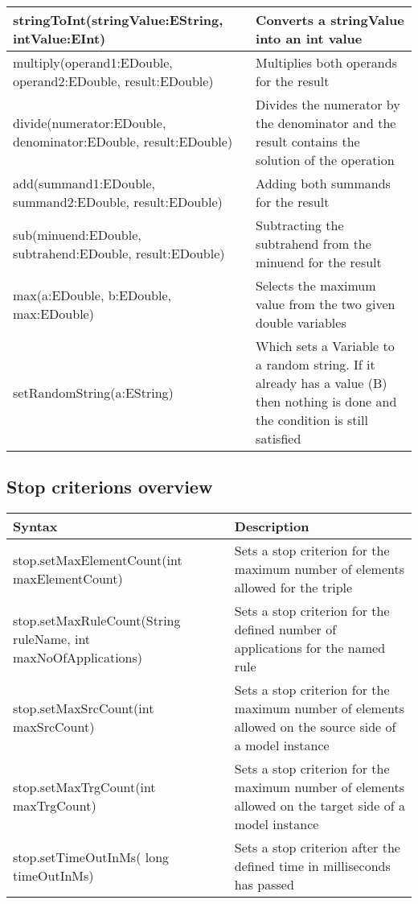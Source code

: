 {\begin{center}
\begin{tabular}{ | m{6cm} | m{7cm} |  }
\hline
stringToInt(stringValue:EString, intValue:EInt) & Converts a stringValue into an int value \\
\hline
multiply(operand1:EDouble, operand2:EDouble, result:EDouble) & Multiplies both operands for the result \\
\hline
divide(numerator:EDouble, denominator:EDouble, result:EDouble)  & Divides the numerator by the denominator  and the result contains the solution of the operation \\
\hline
add(summand1:EDouble, summand2:EDouble, result:EDouble) & Adding both summands for the result \\
\hline
sub(minuend:EDouble, subtrahend:EDouble, result:EDouble)  & Subtracting the subtrahend from the minuend for the result \\
\hline
max(a:EDouble, b:EDouble, max:EDouble) & Selects the maximum value from the two given double variables \\
\hline
setRandomString(a:EString)  & Which sets a Variable to a random string. If it already has a value (B) then nothing is done and the condition is still satisfied \\
\hline

\end{tabular}
\end{center}
}

\clearpage

\subsection{Stop criterions overview}

{
\begin{center}
\begin{tabular}{ | m{6cm} | m{7cm} |  }
\hline
\textbf{Syntax} & \textbf{Description} \\
\hline
stop.setMaxElementCount(int maxElementCount) & Sets a stop criterion for the maximum number of elements allowed for the triple  \\
\hline
 stop.setMaxRuleCount(String ruleName, int maxNoOfApplications) & Sets a stop criterion for the defined number of applications for the named rule  \\
\hline
stop.setMaxSrcCount(int maxSrcCount) & Sets a stop criterion for the maximum number of elements allowed on the source side of a model instance \\
\hline
stop.setMaxTrgCount(int maxTrgCount) & Sets a stop criterion for the maximum number of elements allowed on the target side of a model instance \\
\hline
stop.setTimeOutInMs( long timeOutInMs) & Sets a stop criterion after the defined time in milliseconds has passed \\
\hline

\end{tabular}
\end{center}
}

\clearpage